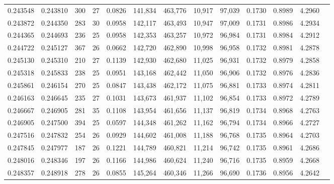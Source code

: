 \begin{tabular}{rrrrrrrrrrrrr}
0.243548 & 0.243810 &    300 &    27 &                                     0.0826 & 141,834 & 463,776 &  10,917 &  97,039 & 0.1730 & 0.8989 & 4.2960 \\
0.243872 & 0.244350 &    283 &    30 &                                     0.0958 & 142,117 & 463,493 &  10,947 &  97,009 & 0.1731 & 0.8986 & 4.2934 \\
0.244365 & 0.244693 &    236 &    25 &                                     0.0958 & 142,353 & 463,257 &  10,972 &  96,984 & 0.1731 & 0.8984 & 4.2912 \\
0.244722 & 0.245127 &    367 &    26 &                                     0.0662 & 142,720 & 462,890 &  10,998 &  96,958 & 0.1732 & 0.8981 & 4.2878 \\
0.245130 & 0.245310 &    210 &    27 &                                     0.1139 & 142,930 & 462,680 &  11,025 &  96,931 & 0.1732 & 0.8979 & 4.2858 \\
0.245318 & 0.245833 &    238 &    25 &                                     0.0951 & 143,168 & 462,442 &  11,050 &  96,906 & 0.1732 & 0.8976 & 4.2836 \\
0.245861 & 0.246154 &    270 &    25 &                                     0.0847 & 143,438 & 462,172 &  11,075 &  96,881 & 0.1733 & 0.8974 & 4.2811 \\
0.246163 & 0.246645 &    235 &    27 &                                     0.1031 & 143,673 & 461,937 &  11,102 &  96,854 & 0.1733 & 0.8972 & 4.2789 \\
0.246667 & 0.246905 &    281 &    35 &                                     0.1108 & 143,954 & 461,656 &  11,137 &  96,819 & 0.1734 & 0.8968 & 4.2763 \\
0.246905 & 0.247500 &    394 &    25 &                                     0.0597 & 144,348 & 461,262 &  11,162 &  96,794 & 0.1734 & 0.8966 & 4.2727 \\
0.247516 & 0.247832 &    254 &    26 &                                     0.0929 & 144,602 & 461,008 &  11,188 &  96,768 & 0.1735 & 0.8964 & 4.2703 \\
0.247845 & 0.247977 &    187 &    26 &                                     0.1221 & 144,789 & 460,821 &  11,214 &  96,742 & 0.1735 & 0.8961 & 4.2686 \\
0.248016 & 0.248346 &    197 &    26 &                                     0.1166 & 144,986 & 460,624 &  11,240 &  96,716 & 0.1735 & 0.8959 & 4.2668 \\
0.248357 & 0.248918 &    278 &    26 &                                     0.0855 & 145,264 & 460,346 &  11,266 &  96,690 & 0.1736 & 0.8956 & 4.2642 \\

\end{tabular}
